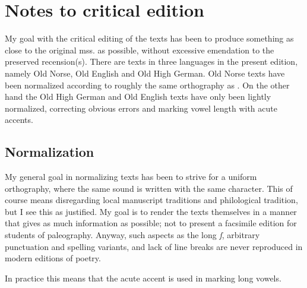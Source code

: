 \section{Notes to critical edition}
  My goal with the critical editing of the texts has been to produce something as close to the original mss. as possible, without excessive emendation to the preserved recension(s). There are texts in three languages in the present edition, namely Old Norse, Old English and Old High German. Old Norse texts have been normalized according to roughly the same orthography as \textcite{FinnurEdda}. On the other hand the Old High German and Old English texts have only been lightly normalized, correcting obvious errors and marking vowel length with acute accents.

  \subsection{Normalization}
    My general goal in normalizing texts has been to strive for a uniform orthography, where the same sound is written with the same character. This of course means disregarding local manuscript traditions and philological tradition, but I see this as justified. My goal is to render the texts themselves in a manner that gives as much information as possible; not to present a facsimile edition for students of paleography. Anyway, such aspects as the long \emph{ſ}, arbitrary punctuation and spelling variants, and lack of line breaks are never reproduced in modern editions of poetry.

    In practice this means that the acute accent is used in marking long vowels. %

